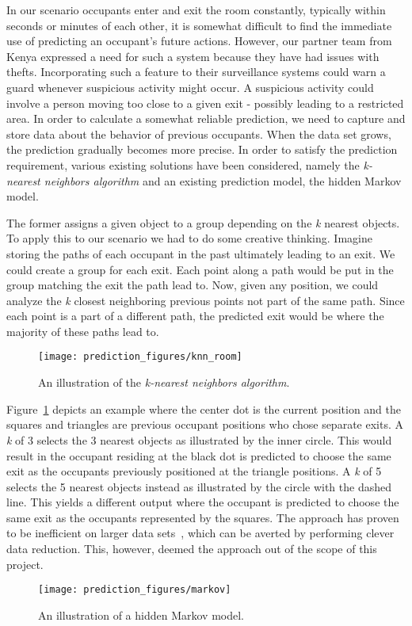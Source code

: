 In our scenario occupants enter and exit the room constantly, typically within seconds or minutes of each other, it is somewhat difficult to find the immediate use of predicting an occupant's future actions. However, our partner team from Kenya expressed a need for such a system because they have had issues with thefts. Incorporating such a feature to their surveillance systems could warn a guard whenever suspicious activity might occur. A suspicious activity could involve a person moving too close to a given exit - possibly leading to a restricted area. In order to calculate a somewhat reliable prediction, we need to capture and store data about the behavior of previous occupants. When the data set grows, the prediction gradually becomes more precise. In order to satisfy the prediction requirement, various existing solutions have been considered, namely the \emph{k-nearest neighbors algorithm} and an existing prediction model, the hidden Markov model. 

The former assigns a given object to a group depending on the \emph{k} nearest objects. To apply this to our scenario we had to do some creative thinking. Imagine storing the paths of each occupant in the past ultimately leading to an exit. We could create a group for each exit. Each point along a path would be put in the group matching the exit the path lead to. Now, given any position, we could analyze the \emph{k} closest neighboring previous points not part of the same path. Since each point is a part of a different path, the predicted exit would be where the majority of these paths lead to.
\begin{figure}[htb]
\centering
\texttt{[image: prediction\_figures/knn\_room]}
\caption{An illustration of the \emph{k-nearest neighbors algorithm}.}
\label{fig:knn}
\end{figure}
Figure~\ref{fig:knn} depicts an example where the center dot is the current position and the squares and triangles are previous occupant positions who chose separate exits. A \emph{k} of 3 selects the 3 nearest objects as illustrated by the inner circle. This would result in the occupant residing at the black dot is predicted to choose the same exit as the occupants previously positioned at the triangle positions. A \emph{k} of 5 selects the 5 nearest objects instead as illustrated by the circle with the dashed line. This yields a different output where the occupant is predicted to choose the same exit as the occupants represented by the squares. The approach has proven to be inefficient on larger data sets~\cite{bhatia}, which can be averted by performing clever data reduction. This, however, deemed the approach out of the scope of this project.
\begin{figure}[htb]
\centering
\texttt{[image: prediction\_figures/markov]}
\caption{An illustration of a hidden Markov model.}
\label{fig:markov}
\end{figure}

